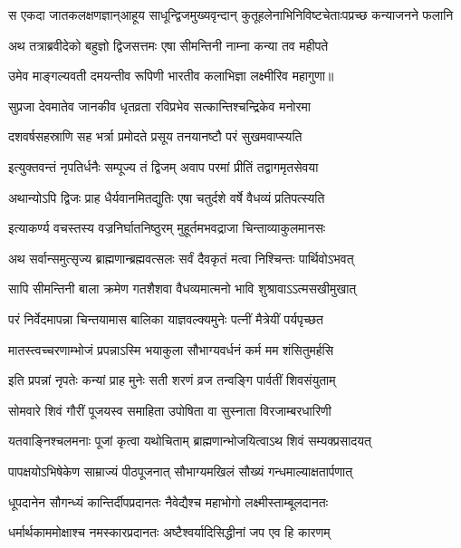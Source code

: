 \fourlineindentedshloka
{स एकदा जातकलक्षणज्ञान्}{आहूय साधून्द्विजमुख्यवृन्दान्}
{कुतूहलेनाभिनिविष्टचेताः}{पप्रच्छ कन्याजनने फलानि} %

\twolineshloka
{अथ तत्राब्रवीदेको बहुज्ञो द्विजसत्तमः}
{एषा सीमन्तिनी नाम्ना कन्या तव महीपते} %

\twolineshloka
{उमेव माङ्गल्यवती दमयन्तीव रूपिणी}
{भारतीव कलाभिज्ञा लक्ष्मीरिव महागुणा॥} %

\twolineshloka
{सुप्रजा देवमातेव जानकीव धृतव्रता}
{रविप्रभेव सत्कान्तिश्चन्द्रिकेव मनोरमा} %

\twolineshloka
{दशवर्षसहस्राणि सह भर्त्रा प्रमोदते}
{प्रसूय तनयानष्टौ परं सुखमवाप्स्यति} %

\twolineshloka
{इत्युक्तवन्तं नृपतिर्धनैः सम्पूज्य तं द्विजम्}
{अवाप परमां प्रीतिं तद्वागमृतसेवया} %

\twolineshloka
{अथान्योऽपि द्विजः प्राह धैर्यवानमितद्युतिः}
{एषा चतुर्दशे वर्षे वैधव्यं प्रतिपत्स्यति} %

\twolineshloka
{इत्याकर्ण्य वचस्तस्य वज्रनिर्घातनिष्ठुरम्}
{मुहूर्तमभवद्राजा चिन्ताव्याकुलमानसः} %

\twolineshloka
{अथ सर्वान्समुत्सृज्य ब्राह्मणान्ब्रह्मवत्सलः}
{सर्वं दैवकृतं मत्वा निश्चिन्तः पार्थिवोऽभवत्} %

\twolineshloka
{सापि सीमन्तिनी बाला क्रमेण गतशैशवा}
{वैधव्यमात्मनो भावि शुश्रावाऽऽत्मसखीमुखात्} %

\twolineshloka
{परं निर्वेदमापन्ना चिन्तयामास बालिका}
{याज्ञवल्क्यमुनेः पत्नीं मैत्रेयीं पर्यपृच्छत} %

\twolineshloka
{मातस्त्वच्चरणाम्भोजं प्रपन्नाऽस्मि भयाकुला}
{सौभाग्यवर्धनं कर्म मम शंसितुमर्हसि} %

\twolineshloka
{इति प्रपन्नां नृपतेः कन्यां प्राह मुनेः सती}
{शरणं व्रज तन्वङ्गि पार्वतीं शिवसंयुताम्} %

\twolineshloka
{सोमवारे शिवं गौरीं पूजयस्व समाहिता}
{उपोषिता वा सुस्नाता विरजाम्बरधारिणी} %

\twolineshloka
{यतवाङ्निश्चलमनाः पूजां कृत्वा यथोचिताम्}
{ब्राह्मणान्भोजयित्वाऽथ शिवं सम्यक्प्रसादयत्} %

\twolineshloka
{पापक्षयोऽभिषेकेण साम्राज्यं पीठपूजनात्}
{सौभाग्यमखिलं सौख्यं गन्धमाल्याक्षतार्पणात्} %

\twolineshloka
{धूपदानेन सौगन्ध्यं कान्तिर्दीपप्रदानतः}
{नैवेद्यैश्च महाभोगो लक्ष्मीस्ताम्बूलदानतः} %

\twolineshloka
{धर्मार्थकाममोक्षाश्च नमस्कारप्रदानतः}
{अष्टैश्वर्यादिसिद्धीनां जप एव हि कारणम्} %

